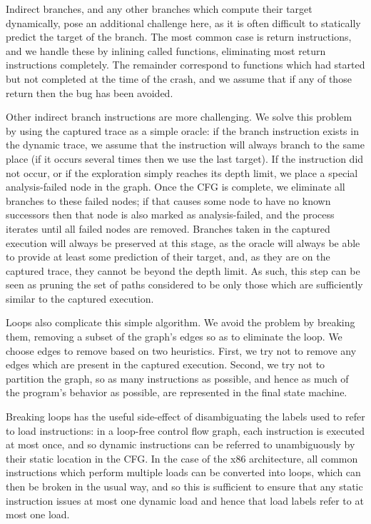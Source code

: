 \documentclass[10pt,twocolumn,preprint,natbib,authoryear]{sigplanconf}
\newcommand{\editorial}[1]{}
\begin{document}
Indirect branches, and any other branches which compute their target
dynamically, pose an additional challenge here, as it is often
difficult to statically predict the target of the branch.  The most
common case is return instructions, and we handle these by inlining
called functions, eliminating most return instructions completely.
The remainder correspond to functions which had started but not
completed at the time of the crash, and we assume that if any of those
return then the bug has been avoided.

Other indirect branch instructions are more challenging.  We solve
this problem by using the captured trace as a simple oracle: if the
branch instruction exists in the dynamic trace, we assume that the
instruction will always branch to the same place (if it occurs several
times then we use the last target).  If the instruction did not occur,
or if the exploration simply reaches its depth limit, we place a
special analysis-failed node in the graph.  Once the CFG is complete,
we eliminate all branches to these failed nodes; if that causes some
node to have no known successors then that node is also marked as
analysis-failed, and the process iterates until all failed nodes are
removed.  Branches taken in the captured execution will always be
preserved at this stage, as the oracle will always be able to provide
at least some prediction of their target, and, as they are on the
captured trace, they cannot be beyond the depth limit\editorial{Not
  sure that's very clear}.  As such, this step can be seen as pruning
the set of paths considered to be only those which are sufficiently
similar to the captured execution.

Loops also complicate this simple algorithm.  We avoid the problem by
breaking them, removing a subset of the graph's edges so as to
eliminate the loop.  We choose edges to remove based on two
heuristics.  First, we try not to remove any edges which are present
in the captured execution.  Second, we try not to partition the graph,
so as many instructions as possible, and hence as much of the
program's behavior as possible, are represented in the final state
machine.

Breaking loops has the useful side-effect of disambiguating the labels
used to refer to load instructions: in a loop-free control flow graph,
each instruction is executed at most once, and so dynamic instructions
can be referred to unambiguously by their static location in the CFG.
In the case of the x86 architecture, all common instructions which
perform multiple loads can be converted into loops, which can then be
broken in the usual way, and so this is sufficient to ensure that any
static instruction issues at most one dynamic load and hence that load
labels refer to at most one load.
\end{document}
